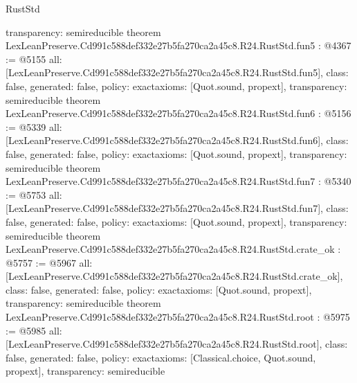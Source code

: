 \begin{lexlean}{RustStd}
\begin{coremodule}
{  transparency: semireducible
}
theorem LexLeanPreserve.Cd991c588def332e27b5fa270ca2a45c8.R24.RustStd.fun5 : @4367 := @5155 {
  all: [LexLeanPreserve.Cd991c588def332e27b5fa270ca2a45c8.R24.RustStd.fun5],
  class: false,
  generated: false,
  policy: exact{axioms: [Quot.sound, propext]},
  transparency: semireducible
}
theorem LexLeanPreserve.Cd991c588def332e27b5fa270ca2a45c8.R24.RustStd.fun6 : @5156 := @5339 {
  all: [LexLeanPreserve.Cd991c588def332e27b5fa270ca2a45c8.R24.RustStd.fun6],
  class: false,
  generated: false,
  policy: exact{axioms: [Quot.sound, propext]},
  transparency: semireducible
}
theorem LexLeanPreserve.Cd991c588def332e27b5fa270ca2a45c8.R24.RustStd.fun7 : @5340 := @5753 {
  all: [LexLeanPreserve.Cd991c588def332e27b5fa270ca2a45c8.R24.RustStd.fun7],
  class: false,
  generated: false,
  policy: exact{axioms: [Quot.sound, propext]},
  transparency: semireducible
}
theorem LexLeanPreserve.Cd991c588def332e27b5fa270ca2a45c8.R24.RustStd.crate_ok : @5757 := @5967 {
  all: [LexLeanPreserve.Cd991c588def332e27b5fa270ca2a45c8.R24.RustStd.crate_ok],
  class: false,
  generated: false,
  policy: exact{axioms: [Quot.sound, propext]},
  transparency: semireducible
}
theorem LexLeanPreserve.Cd991c588def332e27b5fa270ca2a45c8.R24.RustStd.root : @5975 := @5985 {
  all: [LexLeanPreserve.Cd991c588def332e27b5fa270ca2a45c8.R24.RustStd.root],
  class: false,
  generated: false,
  policy: exact{axioms: [Classical.choice, Quot.sound, propext]},
  transparency: semireducible
}


\end{coremodule}
\end{lexlean}
